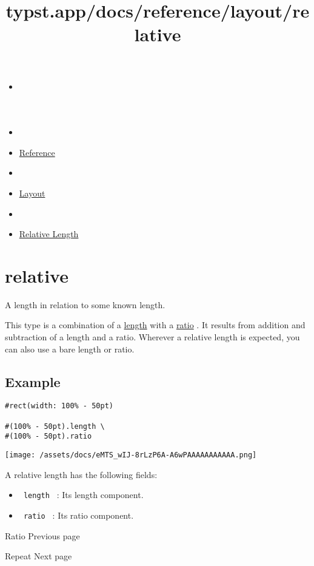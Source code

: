 \title{typst.app/docs/reference/layout/relative}

\begin{itemize}
\tightlist
\item
  \href{/docs}{}
\item
  
\item
  \href{/docs/reference/}{Reference}
\item
  
\item
  \href{/docs/reference/layout/}{Layout}
\item
  
\item
  \href{/docs/reference/layout/relative/}{Relative Length}
\end{itemize}

\section{\texorpdfstring{{ relative }}{ relative }}\label{summary}

A length in relation to some known length.

This type is a combination of a
\href{/docs/reference/layout/length/}{length} with a
\href{/docs/reference/layout/ratio/}{ratio} . It results from addition
and subtraction of a length and a ratio. Wherever a relative length is
expected, you can also use a bare length or ratio.

\subsection{Example}\label{example}

\begin{verbatim}
#rect(width: 100% - 50pt)

#(100% - 50pt).length \
#(100% - 50pt).ratio
\end{verbatim}

\texttt{[image: /assets/docs/eMTS\_wIJ-8rLzP6A-A6wPAAAAAAAAAAA.png]}

A relative length has the following fields:

\begin{itemize}
\tightlist
\item
  \texttt{\ length\ } : Its length component.
\item
  \texttt{\ ratio\ } : Its ratio component.
\end{itemize}

\href{/docs/reference/layout/ratio/}{\pandocbounded{}}

{ Ratio } { Previous page }

\href{/docs/reference/layout/repeat/}{\pandocbounded{}}

{ Repeat } { Next page }
